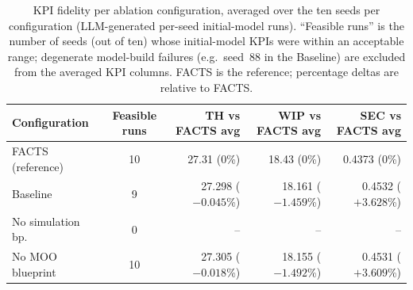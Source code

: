 \documentclass[a4paper,fleqn]{cas-sc}
\begin{document}
  \begin{table}[]                                                                                                                       
  \centering                                                                                                                                
  \caption{KPI fidelity per ablation configuration, averaged over the ten                                                                   
  seeds per configuration (LLM-generated per-seed initial-model runs).                                                                      
  ``Feasible runs'' is the number of seeds (out of ten) whose initial-model                                                                 
  KPIs were within an acceptable range; degenerate model-build failures                                                                     
  (e.g.\ seed~88 in the Baseline) are excluded from the averaged KPI columns.                                                               
  FACTS is the reference; percentage deltas are relative to FACTS.}                                                                         
  \label{tab:ablation_kpi_comparison_extended}                                                                                              
  \begin{tabular}{@{}l c r r r@{}}                                                                                                          
  \toprule                                                                                                                                  
  \textbf{Configuration} & \textbf{Feasible runs} & \textbf{TH vs FACTS avg} & \textbf{WIP vs FACTS avg} & \textbf{SEC vs FACTS avg} \\     
  \midrule                                                                                                                                  
  FACTS (reference)     & 10 & 27.31 ($0$\%)       & 18.43 ($0$\%)       & 0.4373 ($0$\%)      \\                                           
  Baseline              & 9  & 27.298 ($-0.045$\%) & 18.161 ($-1.459$\%) & 0.4532 ($+3.628$\%) \\                                           
  No simulation bp.     & 0  & --                  & --                  & --                  \\                                           
  No MOO blueprint      & 10 & 27.305 ($-0.018$\%) & 18.155 ($-1.492$\%) & 0.4531 ($+3.609$\%) \\                                           

\end{tabular}
\end{table}
\end{document}
